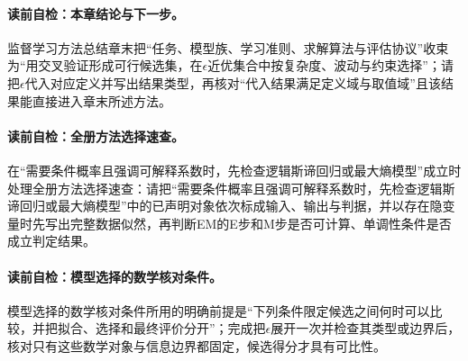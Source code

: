\paragraph{读前自检：本章结论与下一步。}监督学习方法总结章末把“任务、模型族、学习准则、求解算法与评估协议”收束为“用交叉验证形成可行候选集，在$\epsilon$近优集合中按复杂度、波动与约束选择”；请把$\epsilon$代入对应定义并写出结果类型，再核对“代入结果满足定义域与取值域”且该结果能直接进入章末所述方法。\par
\paragraph{读前自检：全册方法选择速查。}在“需要条件概率且强调可解释系数时，先检查逻辑斯谛回归或最大熵模型”成立时处理全册方法选择速查：请把“需要条件概率且强调可解释系数时，先检查逻辑斯谛回归或最大熵模型”中的已声明对象依次标成输入、输出与判据，并以存在隐变量时先写出完整数据似然，再判断EM的E步和M步是否可计算、单调性条件是否成立判定结果。\par
\paragraph{读前自检：模型选择的数学核对条件。}模型选择的数学核对条件所用的明确前提是“下列条件限定候选之间何时可以比较，并把拟合、选择和最终评价分开”；完成把$\epsilon$展开一次并检查其类型或边界后，核对只有这些数学对象与信息边界都固定，候选得分才具有可比性。\par

